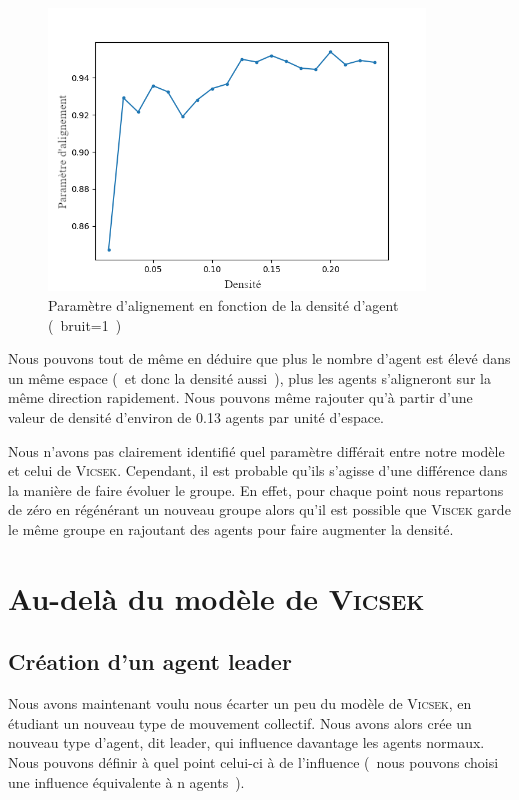 \documentclass[french, a4paper, 12pt, openany]{report}
\begin{document}
       \begin{figure}[!h]
		\centering
		\includegraphics[width=10cm]{images/densite_1[noise=1]2.png}
		\caption{Paramètre d'alignement en fonction de la densité d'agent (~bruit=1~)}
		\label{densité_alignement}
	\end{figure}
	
	Nous pouvons tout de même en déduire que plus le nombre d'agent est élevé dans un même espace (~et donc la densité aussi~), plus les agents s'aligneront sur la même direction rapidement. Nous pouvons même rajouter qu'à partir d'une valeur de densité d'environ de 0.13 agents par unité d'espace. 
	
	Nous n'avons pas clairement identifié quel paramètre différait entre notre modèle et celui de \textsc{Vicsek}. Cependant, il est probable qu'ils s'agisse d'une différence dans la manière de faire évoluer le groupe. En effet, pour chaque point nous repartons de zéro en régénérant un nouveau groupe alors qu'il est possible que \textsc{Viscek} garde le même groupe en rajoutant des agents pour faire augmenter la densité.
    \newpage
    \section{Au-delà du modèle de \textsc{Vicsek}}
    \subsection{Création d'un agent leader}
       Nous avons maintenant voulu nous écarter un peu du modèle de \textsc{Vicsek}, en étudiant un nouveau type de mouvement collectif. Nous avons alors crée un nouveau type d'agent, dit leader, qui influence davantage les agents normaux. Nous pouvons définir à quel point celui-ci à de l'influence (~nous pouvons choisi une influence équivalente à n agents~).\\
       
\end{document}
